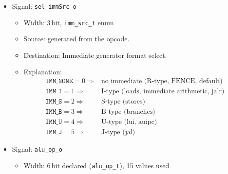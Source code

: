\begin{itemize}
\begin{itemize}
    \item Width: 1\,bit, unsigned
    \item Source: opcode=103 (\texttt{jalr}) only.
    \item Destination: Branch-target-adder source-A select.
    \item Explanation: \[ \begin{array}{ll}
                                              0 \Rightarrow & \mbox{PC to branch-target-adder input A (default: branches, JAL)} \\
                                              1 \Rightarrow & \mbox{register rs1 to branch-target-adder input A (JALR)}
                                              \end{array} \]
  \end{itemize}
  \item Signal: \texttt{sel\_immSrc\_o}
  \begin{itemize}
    \item Width: 3\,bit, \texttt{imm\_src\_t} enum
    \item Source: generated from the opcode.
    \item Destination: Immediate generator format select.
    \item Explanation: \[ \begin{array}{ll}
                                              \texttt{IMM\_NONE}=0 \Rightarrow & \mbox{no immediate (R-type, FENCE, default)} \\
                                              \texttt{IMM\_I}=1 \Rightarrow & \mbox{I-type (loads, immediate arithmetic, jalr)} \\
                                              \texttt{IMM\_S}=2 \Rightarrow & \mbox{S-type (stores)} \\
                                              \texttt{IMM\_B}=3 \Rightarrow & \mbox{B-type (branches)} \\
                                              \texttt{IMM\_U}=4 \Rightarrow & \mbox{U-type (lui, auipc)} \\
                                              \texttt{IMM\_J}=5 \Rightarrow & \mbox{J-type (jal)}
                                              \end{array} \]
  \end{itemize}
  \item Signal: \texttt{alu\_op\_o}
  \begin{itemize}
    \item Width: 6\,bit declared (\texttt{alu\_op\_t}), 15 values used

\end{itemize}
\end{itemize}
